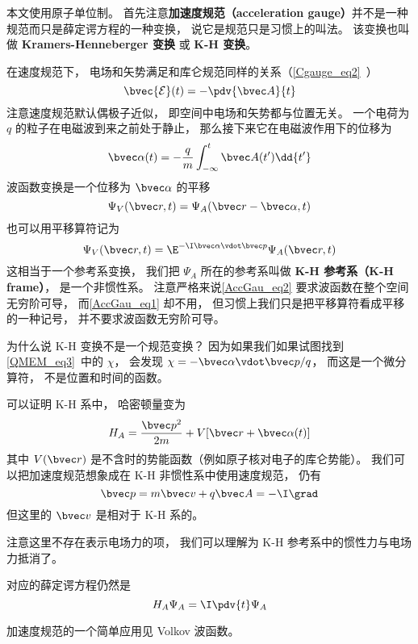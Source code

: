 

本文使用原子单位制。 首先注意\textbf{加速度规范（acceleration gauge）}并不是一种规范而只是薛定谔方程的一种变换， 说它是规范只是习惯上的叫法。 该变换也叫做 \textbf{Kramers-Henneberger 变换} 或 \textbf{K-H 变换}。

在速度规范下， 电场和矢势满足和库仑规范同样的关系（\autoref{Cgauge_eq2}~）
\begin{equation}
\bvec {\mathcal{E}}(t) = -\pdv{\bvec A}{t}
\end{equation}
注意速度规范默认偶极子近似， 即空间中电场和矢势都与位置无关。 一个电荷为 $q$ 的粒子在电磁波到来之前处于静止， 那么接下来它在电磁波作用下的位移为
\begin{equation}\label{AccGau_eq3}
\bvec \alpha(t) = -\frac{q}{m}\int_{-\infty}^t \bvec A(t') \dd{t'}
\end{equation}
波函数变换是一个位移为 $\bvec \alpha$ 的平移
\begin{equation}\label{AccGau_eq1}
\Psi_V(\bvec r, t) = \Psi_A(\bvec r - \bvec \alpha, t)
\end{equation}
也可以用平移算符记为
\begin{equation}\label{AccGau_eq2}
\Psi_V(\bvec r, t) = \E^{-\I \bvec \alpha \vdot \bvec p} \Psi_A(\bvec r, t)
\end{equation}
这相当于一个参考系变换， 我们把 $\Psi_A$ 所在的参考系叫做 \textbf{K-H 参考系（K-H frame）}， 是一个非惯性系。 注意严格来说\autoref{AccGau_eq2} 要求波函数在整个空间无穷阶可导， 而\autoref{AccGau_eq1} 却不用， 但习惯上我们只是把平移算符看成平移的一种记号， 并不要求波函数无穷阶可导。

为什么说 K-H 变换不是一个规范变换？ 因为如果我们如果试图找到\autoref{QMEM_eq3}~中的 $\chi$， 会发现 $\chi = -\bvec \alpha \vdot \bvec p/q$， 而这是一个微分算符， 不是位置和时间的函数。

可以证明 K-H 系中， 哈密顿量变为
\begin{equation}
H_A = \frac{\bvec p^2}{2m} + V[\bvec r + \bvec \alpha(t)]
\end{equation}
其中 $V(\bvec r)$ 是不含时的势能函数（例如原子核对电子的库仑势能）。 我们可以把加速度规范想象成在 K-H 非惯性系中使用速度规范， 仍有
\begin{equation}
\bvec p = m\bvec v + q\bvec A = -\I \grad
\end{equation}
但这里的 $\bvec v$ 是相对于 K-H 系的。

注意这里不存在表示电场力的项， 我们可以理解为 K-H 参考系中的惯性力与电场力抵消了。

对应的薛定谔方程仍然是
\begin{equation}\label{AccGau_eq4}
H_A \Psi_A = \I \pdv{t} \Psi_A
\end{equation}

加速度规范的一个简单应用见 Volkov 波函数。

